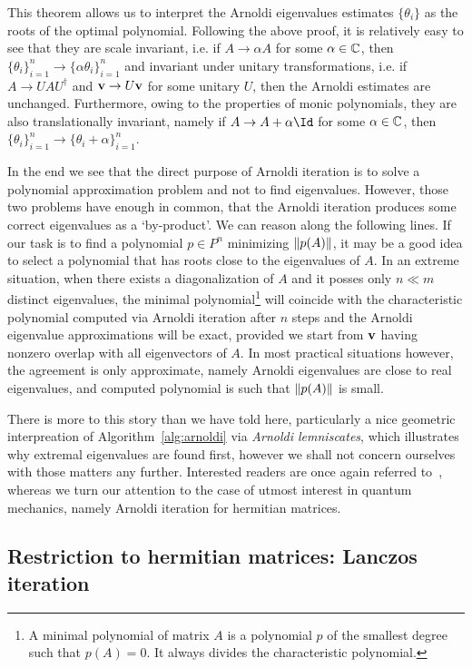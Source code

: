 This theorem allows us to interpret the Arnoldi eigenvalues estimates \(\{\theta_i\}\) as the roots of the optimal
polynomial. Following the above proof, it is relatively easy to see that they are scale invariant, i.e.
if \(A\to\alpha A\) for some \(\alpha\in\mathbb{C}\), then \(\{\theta_i\}_{i=1}^n \to \{\alpha\theta_i\}_{i=1}^n\)
and invariant under unitary transformations, i.e. if \(A\to UAU^{\dagger}\) and \(\vectorbold{v}\to U\vectorbold{v}\) for
some unitary \(U\), then the Arnoldi estimates are unchanged. Furthermore, owing to the properties of monic polynomials,
they are also translationally invariant, namely if \(A\to A + \alpha \Id\) for some \(\alpha\in\mathbb{C}\), then
\(\{\theta_i\}_{i=1}^n \to \{\theta_i + \alpha\}_{i=1}^n\).

In the end we see that the direct purpose of Arnoldi iteration is to solve a polynomial approximation problem
and not to find eigenvalues. However, those two problems have enough in common, that the Arnoldi iteration
produces some correct eigenvalues as a `by-product'. We can reason along the following lines. If our task
is to find a polynomial \(p\in P^n\) minimizing \(\norm{p(A)}\), it may be a good idea to select a polynomial
that has roots close to the eigenvalues of \(A\).  In an extreme situation, when there exists a diagonalization
of \(A\) and it posses only \(n\ll m\) distinct eigenvalues, the minimal polynomial\footnote{A minimal polynomial
of matrix \(A\) is a polynomial \(p\) of the smallest degree such that \(p(A) = 0\). It always divides the
characteristic polynomial.} will coincide with the characteristic polynomial computed via Arnoldi iteration
after \(n\) steps and the Arnoldi eigenvalue approximations will be exact,
provided we start from \(\vectorbold{v}\) having nonzero overlap with all eigenvectors of \(A\).
In most practical situations however, the agreement is only approximate, namely Arnoldi eigenvalues are close to real
eigenvalues, and computed polynomial is such that \(\norm{p(A)}\) is small.

There is more to this story than we have told here, particularly a nice geometric interpreation
of Algorithm~\ref{alg:arnoldi} via \textit{Arnoldi lemniscates}, which illustrates why extremal eigenvalues
are found first, however we shall not concern ourselves with those
matters any further. Interested readers are once again referred to~\textcite{Trefethen1997},
whereas we turn our attention to the case of utmost interest in quantum mechanics, namely Arnoldi iteration
for hermitian matrices.

\subsection{Restriction to hermitian matrices: Lanczos iteration}

